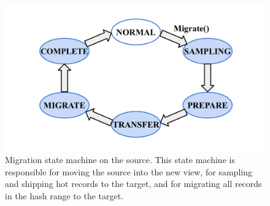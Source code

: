 \begin{figure}[t]
\centering
\includegraphics[width=\columnwidth]{figures/source.pdf}
\caption{Migration state machine on the source. This state machine is
    responsible for
    moving the source into the new view, for sampling and shipping hot records to the target, and for migrating all
    records in the hash range to the target.}
\label{fig:source}
\end{figure}
